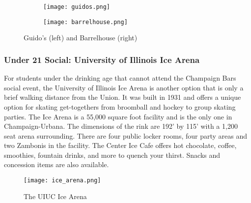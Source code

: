 \begin{figure}[H]
	\centering
	\begin{subfigure}{0.5\textwidth}
		\centering
		\texttt{[image: guidos.png]}
	\end{subfigure}%
	\begin{subfigure}{0.5\textwidth}
		\centering
		\texttt{[image: barrelhouse.png]}
	\end{subfigure}	
	\caption{Guido's (left) and Barrelhouse (right)}	
\end{figure}


\subsubsection{Under 21 Social: University of Illinois Ice Arena}
For students under the drinking age that cannot attend the Champaign Bars social event, the University of Illinois Ice Arena is another option that is only a brief walking distance from the Union. It was built in 1931 and offers a unique option for skating get-togethers from broomball and hockey to group skating parties. The Ice Arena is a 55,000 square foot facility and is the only one in Champaign-Urbana. The dimensions of the rink are 192' by 115' with a 1,200 seat arena surrounding. There are four public locker rooms, four party areas and two Zambonis in the facility. The Center Ice Cafe offers hot chocolate, coffee, smoothies, fountain drinks, and more to quench your thirst. Snacks and concession items are also available.
\vspace{0.5cm}\newline
\begin{figure}[H]
	\centering
	\texttt{[image: ice\_arena.png]}
	\caption{The UIUC Ice Arena}
\end{figure}


